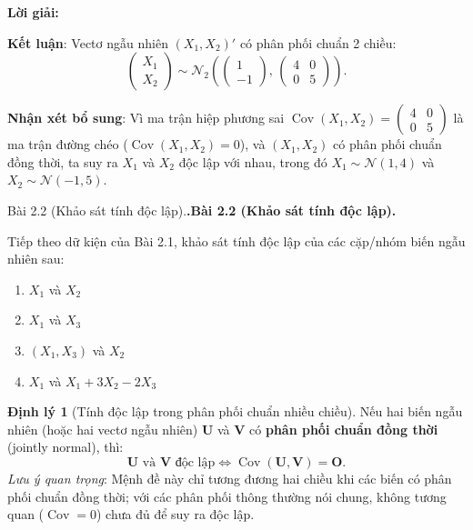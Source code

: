 \documentclass[11pt,a4paper]{article}
\makeatletter
\newcounter{prob}
\newenvironment{problem}[1][]{%
  \par\medskip\noindent
  \def\@tempa{#1}%
  \ifx\@tempa\@empty\refstepcounter{prob}\textbf{\theprob.}\else\textbf{#1}\fi
  \ \ignorespaces
}{\par}
\newenvironment{solution}{%
  \par\noindent\textbf{Lời giải:}\ \ignorespaces
}{\par}
\theoremstyle{definition}
\newtheorem{thm}{Định lý}
\newcommand{\answer}[1]{\boxed{#1}}
\makeatother
\begin{document}
\begin{solution}
\textbf{Kết luận}:
Vectơ ngẫu nhiên $(X_1, X_2)'$ có phân phối chuẩn 2 chiều:
\[
\begin{pmatrix} X_1 \\ X_2 \end{pmatrix} \sim \answer{\mathcal{N}_2\left( \begin{pmatrix} 1 \\ -1 \end{pmatrix}, \, \begin{pmatrix} 4 & 0 \\ 0 & 5 \end{pmatrix} \right)}.
\]

\textbf{Nhận xét bổ sung}: Vì ma trận hiệp phương sai $\operatorname{Cov}(X_1, X_2) = \begin{pmatrix} 4 & 0 \\ 0 & 5 \end{pmatrix}$ là ma trận đường chéo ($\operatorname{Cov}(X_1, X_2) = 0$), và $(X_1, X_2)$ có phân phối chuẩn đồng thời, ta suy ra $X_1$ và $X_2$ độc lập với nhau, trong đó $X_1 \sim \mathcal{N}(1, 4)$ và $X_2 \sim \mathcal{N}(-1, 5)$.
\end{solution}

\begin{problem}[Bài 2.2 (Khảo sát tính độc lập).]
Tiếp theo dữ kiện của Bài 2.1, khảo sát tính độc lập của các cặp/nhóm biến ngẫu nhiên sau:
\begin{enumerate}[label=\alph*)]
  \item $X_1$ và $X_2$
  \item $X_1$ và $X_3$
  \item $(X_1, X_3)$ và $X_2$
  \item $X_1$ và $X_1 + 3X_2 - 2X_3$
\end{enumerate}
\end{problem}

\begin{thm}[Tính độc lập trong phân phối chuẩn nhiều chiều]
Nếu hai biến ngẫu nhiên (hoặc hai vectơ ngẫu nhiên) $\mathbf{U}$ và $\mathbf{V}$ có \textbf{phân phối chuẩn đồng thời} (jointly normal), thì:
\[
\mathbf{U} \text{ và } \mathbf{V} \text{ độc lập} \iff \operatorname{Cov}(\mathbf{U}, \mathbf{V}) = \mathbf{O}.
\]
\textit{Lưu ý quan trọng}: Mệnh đề này chỉ tương đương hai chiều khi các biến có phân phối chuẩn đồng thời; với các phân phối thông thường nói chung, không tương quan ($\operatorname{Cov} = 0$) chưa đủ để suy ra độc lập.
\end{thm}
\end{document}
